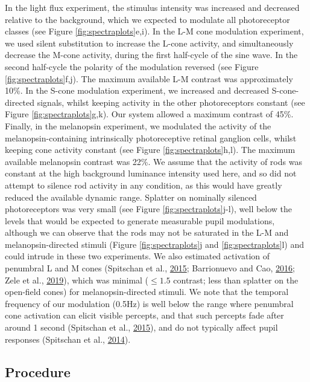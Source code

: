 \documentclass[
]{article}
\begin{document}
In the light flux experiment, the stimulus intensity was increased and decreased relative to the background, which we expected to modulate all photoreceptor classes (see Figure \ref{fig:spectraplots}e,i). In the L-M cone modulation experiment, we used silent substitution to increase the L-cone activity, and simultaneously decrease the M-cone activity, during the first half-cycle of the sine wave. In the second half-cycle the polarity of the modulation reversed (see Figure \ref{fig:spectraplots}f,j). The maximum available L-M contrast was approximately 10\%. In the S-cone modulation experiment, we increased and decreased S-cone-directed signals, whilst keeping activity in the other photoreceptors constant (see Figure \ref{fig:spectraplots}g,k). Our system allowed a maximum contrast of 45\%. Finally, in the melanopsin experiment, we modulated the activity of the melanopsin-containing intrinsically photoreceptive retinal ganglion cells, whilst keeping cone activity constant (see Figure \ref{fig:spectraplots}h,l). The maximum available melanopsin contrast was 22\%. We assume that the activity of rods was constant at the high background luminance intensity used here, and so did not attempt to silence rod activity in any condition, as this would have greatly reduced the available dynamic range. Splatter on nominally silenced photoreceptors was very small (see Figure \ref{fig:spectraplots}j-l), well below the levels that would be expected to generate measurable pupil modulations, although we can observe that the rods may not be saturated in the L-M and melanopsin-directed stimuli (Figure \ref{fig:spectraplots}j and \ref{fig:spectraplots}l) and could intrude in these two experiments. We also estimated activation of penumbral L and M cones (Spitschan et al., \protect\hyperlink{ref-Spitschan2015}{2015}; Barrionuevo and Cao, \protect\hyperlink{ref-Barrionuevo2016}{2016}; Zele et al., \protect\hyperlink{ref-Zele2019}{2019}), which was minimal (\(\le 1.5%
\) contrast; less than splatter on the open-field cones) for melanopsin-directed stimuli. We note that the temporal frequency of our modulation (0.5Hz) is well below the range where penumbral cone activation can elicit visible percepts, and that such percepts fade after around 1 second (Spitschan et al., \protect\hyperlink{ref-Spitschan2015}{2015}), and do not typically affect pupil responses (Spitschan et al., \protect\hyperlink{ref-Spitschan2014}{2014}).

\hypertarget{procedure}{%
\subsection{Procedure}\label{procedure}}
\end{document}
